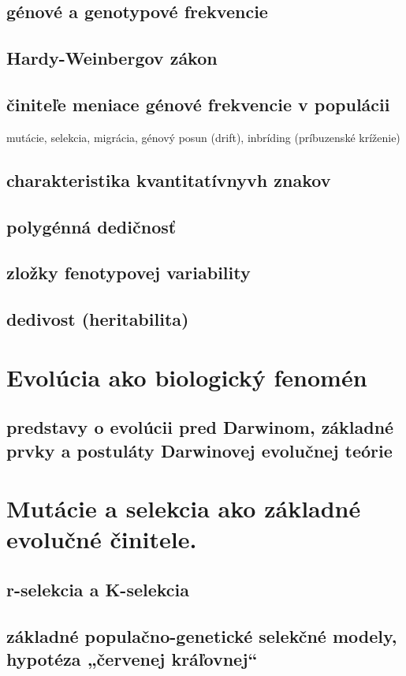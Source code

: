 \subsection{génové a genotypové frekvencie}
\subsection{Hardy-Weinbergov zákon}
\subsection{činiteľe meniace génové frekvencie v populácii}
mutácie, selekcia, migrácia, génový posun (drift), inbríding (príbuzenské kríženie)\\
\subsection{charakteristika kvantitatívnyvh znakov}
\subsection{polygénná dedičnosť}
\subsection{zložky fenotypovej variability}
\subsection{dedivost (heritabilita)}

\section{Evolúcia ako biologický fenomén}
\subsection{predstavy o evolúcii pred Darwinom, základné prvky a postuláty Darwinovej evolučnej teórie}

\section{Mutácie a selekcia ako základné evolučné činitele.}
\subsection{r-selekcia a K-selekcia}
\subsection{základné populačno-genetické selekčné modely, hypotéza „červenej kráľovnej“}

